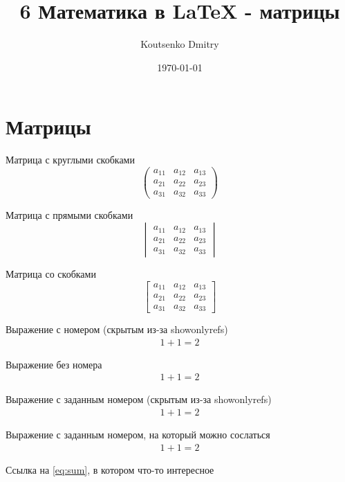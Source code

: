\documentclass[a4paper,12pt,leqno]{article}                 %
\title{6 Математика в \LaTeX{} - матрицы}
\author{Koutsenko Dmitry}
\date{\today}
\begin{document}

\maketitle

\section{Матрицы}

Матрица с круглыми скобками
\[
    \begin{pmatrix}
        a_{11} & a_{12} & a_{13} \\
        a_{21} & a_{22} & a_{23} \\
        a_{31} & a_{32} & a_{33}
    \end{pmatrix}
\]

Матрица с прямыми скобками
\[
    \begin{vmatrix}
        a_{11} & a_{12} & a_{13} \\
        a_{21} & a_{22} & a_{23} \\
        a_{31} & a_{32} & a_{33}
    \end{vmatrix}
\]

Матрица со скобками
\[
    \begin{bmatrix}
        a_{11} & a_{12} & a_{13} \\
        a_{21} & a_{22} & a_{23} \\
        a_{31} & a_{32} & a_{33}
    \end{bmatrix}
\]

Выражение с номером (скрытым из-за showonlyrefs)
\begin{align}
    1+1=2
\end{align}

Выражение без номера
\begin{align*}
    1+1=2
\end{align*}

Выражение с заданным номером (скрытым из-за showonlyrefs)
\begin{align}
    1+1=2 \tag{S1}
\end{align}

Выражение с заданным номером, на который можно сослаться
\begin{align}
    1+1=2 \tag{S2} \label{eq:sum}
\end{align}

Ссылка на \eqref{eq:sum}, в котором что-то интересное
\end{document}
